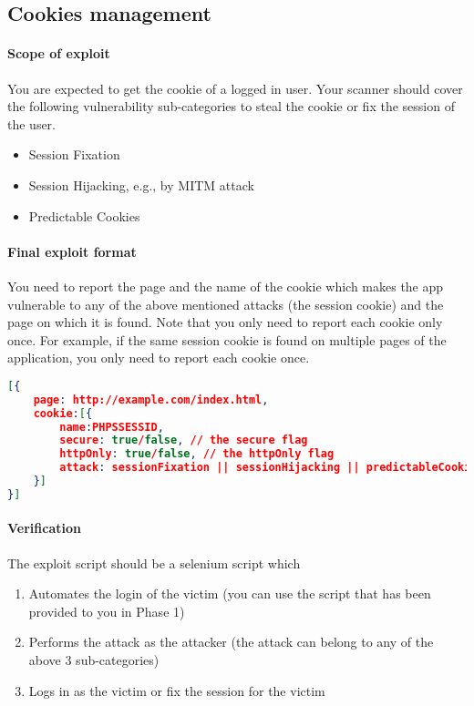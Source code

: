 \documentclass{article}[10pt]
\begin{document}
\subsection{Cookies management}
\paragraph{Scope of exploit}
You are expected to get the cookie of a logged in user. Your scanner should cover the following vulnerability sub-categories to steal the cookie or fix the session of the user.
	\begin{itemize}
		\item Session Fixation
		\item Session Hijacking, e.g., by MITM attack
		\item Predictable Cookies
	\end{itemize}

\paragraph{Final exploit format}
You need to report the page and the name of the cookie which makes the app vulnerable to any of the above mentioned attacks (the session cookie) and the page on which it is found. Note that you only need to report each cookie only once. For example, if the same session cookie is found on multiple pages of the application, you only need to report each cookie once. 

\begin{lstlisting}[language=json,firstnumber=1]
[{
	page: http://example.com/index.html,
	cookie:[{
		name:PHPSSESSID,
		secure: true/false, // the secure flag
		httpOnly: true/false, // the httpOnly flag
		attack: sessionFixation || sessionHijacking || predictableCookies
	}]
}]
\end{lstlisting}

\paragraph{Verification}
The exploit script should be a selenium script which
\begin{enumerate}
\item Automates the login of the victim (you can use the script that has been provided to you in Phase 1)
\item Performs the attack as the attacker (the attack can belong to any of the above 3 sub-categories)
\item Logs in as the victim or fix the session for the victim
\end{enumerate}
\end{document}
